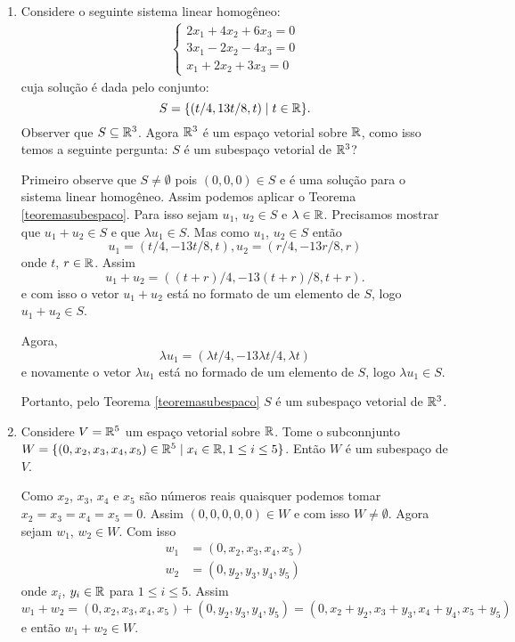 \begin{exemplos}
  \begin{enumerate}[label={\arabic*})]
    \item Considere o seguinte sistema linear homogêneo:
      \begin{align}\label{exemplosistemahomogeneosubespaco}
        \begin{cases}
          2x_1 + 4x_2 + 6x_3 = 0\\
          3x_1 - 2x_2 - 4x_3 = 0\\
          x_1 + 2x_2 + 3x_3 = 0
        \end{cases}
      \end{align}
      cuja solução é dada pelo conjunto:
      \[
        S = \{(t/4,13t/8,t) \mid t \in \mathbb{R}\}.
      \]
      Observer que $S \subseteq \mathbb{R}^3$. Agora $\mathbb{R}^3$ é um espaço vetorial sobre $\mathbb{R}$, como isso temos a seguinte pergunta: $S$ é um subespaço vetorial de $\mathbb{R}^3$?
      \begin{solucao}
        Primeiro observe que $S \ne \emptyset$ pois $(0,0,0) \in S$ e é uma solução para o sistema linear homogêneo. Assim podemos aplicar o Teorema \ref{teoremasubespaco}. Para isso sejam $u_1$, $u_2 \in S$ e $\lambda \in \mathbb{R}$.
        Precisamos mostrar que $u_1 + u_2 \in S$ e que $\lambda u_1 \in S$. Mas como $u_1$, $u_2 \in S$ então
        \[
          u_1 = (t/4, -13t/8, t),
          u_2 = (r/4, -13r/8,r)
        \]
        onde $t$, $r \in \mathbb{R}$. Assim
        \[
          u_1 + u_2 = ((t + r)/4, -13(t + r)/8, t + r).
        \]
        e com isso o vetor $u_1 + u_2$ está no formato de um elemento de $S$, logo $u_1 + u_2 \in S$.

                Agora,
                \[
                    \lambda u_1 = (\lambda t/4, -13\lambda t/4, \lambda t)
                \]
          e novamente o vetor $\lambda u_1$ está no formado de um elemento de $S$, logo $\lambda u_1 \in S$.

                Portanto, pelo Teorema \ref{teoremasubespaco} $S$ é um subespaço vetorial de $\mathbb{R}^3$.
      \end{solucao}
  \item Considere $V = \mathbb{R}^5$ um espaço vetorial sobre $\mathbb{R}$. Tome o subconnjunto $W = \{(0,x_2,x_3,x_4,x_5) \in \mathbb{R}^5 \mid x_i \in \mathbb{R}, 1 \le i \le 5\}$. Então $W$ \'e um subespa\c{c}o de $V$.
    \begin{solucao}
      Como $x_2$, $x_3$, $x_4$ e $x_5$ são números reais quaisquer podemos tomar $x_2 = x_3 = x_4 = x_ 5 = 0$. Assim $(0, 0, 0, 0, 0) \in W$ e com isso $W \ne \emptyset$. Agora sejam $w_1$, $w_2 \in W$. Com isso
      \begin{align*}
        w_1 &= (0,x_2, x_3, x_4, x_5)\\
        w_2 &= (0,y_2, y_3, y_4, y_5)
      \end{align*}
      onde $x_i$, $y_i \in \mathbb{R}$ para $1 \le i \le 5$. Assim
      \[
        w_1 + w_2 = (0,x_2, x_3, x_4, x_5) + (0,y_2, y_3, y_4, y_5) = (0, x_2 + y_2, x_3 + y_3, x_4 + y_4, x_5 + y_5)
      \]
      e então $w_1 + w_2 \in W$.


\end{solucao}
\end{enumerate}
\end{exemplos}
